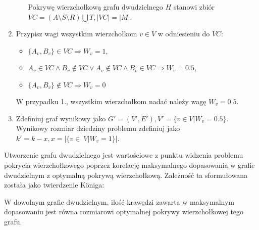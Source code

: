 \begin{enumerate}
\begin{itemize}
        Pokrywę wierzchołkową grafu dwudzielnego $H$ stanowi zbiór 
        ${VC=(A \setminus S \setminus R) \bigcup T}, |VC|=|M|$.
    \end{itemize}
  \item Przypisz wagi wszystkim wierzchołkom $v \in V$ w odniesieniu do $VC$:
    \begin{itemize}
      \item $\{A_v, B_v\} \in VC \Rightarrow W_v=1$,
      \item $A_v \in VC \land B_v \notin VC \lor A_v \notin VC \land B_v \in
        VC \Rightarrow W_v=0.5$,
      \item $\{A_v, B_v\} \notin VC \Rightarrow W_v=0$
    \end{itemize}
    W przypadku 1., wszystkim wierzchołkom nadać należy wagę $W_v=0.5$.
  \item Zdefiniuj graf wynikowy jako 
    $G\prime=(V\prime, E\prime), V\prime=\{v \in V|W_v=0.5\}$.
    Wynikowy rozmiar dziedziny problemu zdefiniuj jako 
    ${k\prime=k-x, x=|\{v\in~V|W_v=1\}}|$.
\end{enumerate}

Utworzenie grafu dwudzielnego jest wartościowe z punktu widzenia problemu
pokrycia wierzchołkowego poprzez korelację maksymalnego dopasowania w grafie
dwudzielnym z optymalną pokrywą wierzchołkową. 
Zależność ta sformułowana została jako twierdzenie K\"oniga:

\begin{theorem}
  W dowolnym grafie dwudzielnym, ilość krawędzi zawarta w maksymalnym
  dopasowaniu jest równa rozmiarowi optymalnej pokrywy wierzchołkowej tego
  grafu.
\end{theorem}

